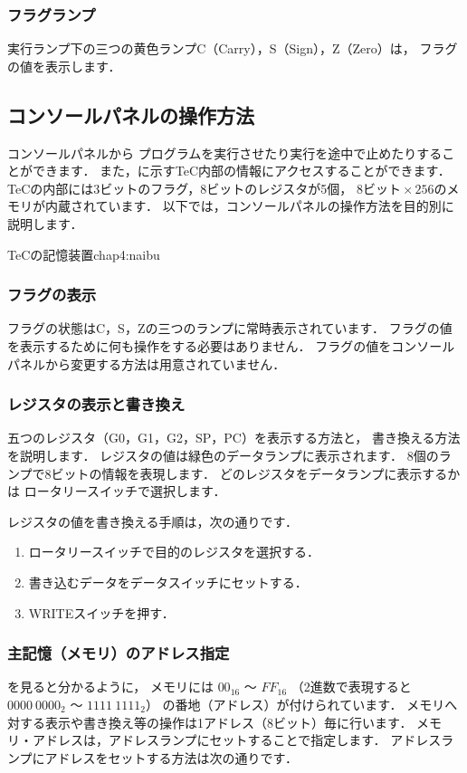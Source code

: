 \subsubsection{フラグランプ}
実行ランプ下の三つの黄色ランプC（Carry），S（Sign），Z（Zero）は，
フラグの値を表示します．

\subsection{コンソールパネルの操作方法}
\label{operation}
コンソールパネルから
プログラムを実行させたり実行を途中で止めたりすることができます．
また，に示すTeC内部の情報にアクセスすることができます．
TeCの内部には3ビットのフラグ，8ビットのレジスタが5個，
$8ビット \times 256$のメモリが内蔵されています．
以下では，コンソールパネルの操作方法を目的別に説明します．

          {TeCの記憶装置}{chap4:naibu}

\subsubsection{フラグの表示}
フラグの状態はC，S，Zの三つのランプに常時表示されています．
フラグの値を表示するために何も操作をする必要はありません．
フラグの値をコンソールパネルから変更する方法は用意されていません．

\subsubsection{レジスタの表示と書き換え}
五つのレジスタ（G0，G1，G2，SP，PC）を表示する方法と，
書き換える方法を説明します．
レジスタの値は緑色のデータランプに表示されます．
8個のランプで8ビットの情報を表現します．
どのレジスタをデータランプに表示するかは
ロータリースイッチで選択します．
\vspace{0.3cm}

レジスタの値を書き換える手順は，次の通りです．
\begin{enumerate}
\item ロータリースイッチで目的のレジスタを選択する．
\item 書き込むデータをデータスイッチにセットする．
\item WRITEスイッチを押す．
\end{enumerate}

\subsubsection{主記憶（メモリ）のアドレス指定}
を見ると分かるように，
メモリには $00_{16}$ 〜 $FF_{16}$
（2進数で表現すると $0000~0000_{2}$ 〜 $1111~1111_{2}$）
の番地（アドレス）が付けられています．
メモリへ対する表示や書き換え等の操作は1アドレス（8ビット）毎に行います．
メモリ・アドレスは，アドレスランプにセットすることで指定します．
アドレスランプにアドレスをセットする方法は次の通りです．

